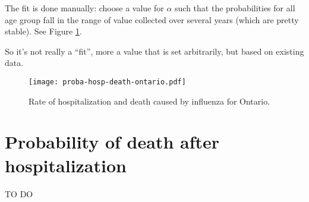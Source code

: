 \documentclass[10pt,twocolumn]{article}
\begin{document}
The fit is done manually: choose a value for $\alpha$ such that the probabilities for all age group fall in the range of value collected over several years (which are pretty stable\cite{Schanzer:2013dn}). See Figure \ref{fig:probaHospDeath}.


So it's not really a ``fit'', more a value that is set arbitrarily, but based on existing data.

\begin{figure}[htbp]
   \centering
   \texttt{[image: proba-hosp-death-ontario.pdf]} %
   \caption{Rate of hospitalization and death caused by influenza for Ontario.}
   \label{fig:probaHospDeath}
\end{figure}


\section{Probability of death after hospitalization}


TO DO
\end{document}
